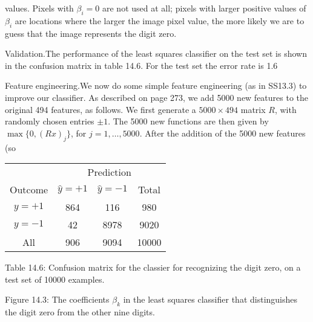 values. Pixels with \(\beta_{i}=0\) are not used at all; pixels with larger positive values of \(\beta_{i}\) are locations where the larger the image pixel value, the more likely we are to guess that the image represents the digit zero.

Validation.The performance of the least squares classifier on the test set is shown in the confusion matrix in table 14.6. For the test set the error rate is 1.6%

Feature engineering.We now do some simple feature engineering (as in SS13.3) to improve our classifier. As described on page 273, we add 5000 new features to the original 494 features, as follows. We first generate a \(5000\times 494\) matrix \(R\), with randomly chosen entries \(\pm 1\). The 5000 new functions are then given by \(\max\{0,(Rx)_{j}\}\), for \(j=1,\ldots,5000\). After the addition of the 5000 new features (so

\begin{table}
\begin{tabular}{c c c c} \hline \hline  & \multicolumn{3}{c}{Prediction} \\ \cline{2-4} Outcome & \(\hat{y}=+1\) & \(\hat{y}=-1\) & Total \\ \hline \(y=+1\) & 864 & 116 & 980 \\ \(y=-1\) & 42 & 8978 & 9020 \\ All & 906 & 9094 & 10000 \\ \hline \hline \end{tabular}
\end{table}
Table 14.6: Confusion matrix for the classier for recognizing the digit zero, on a test set of 10000 examples.

Figure 14.3: The coefficients \(\beta_{k}\) in the least squares classifier that distinguishes the digit zero from the other nine digits.

 